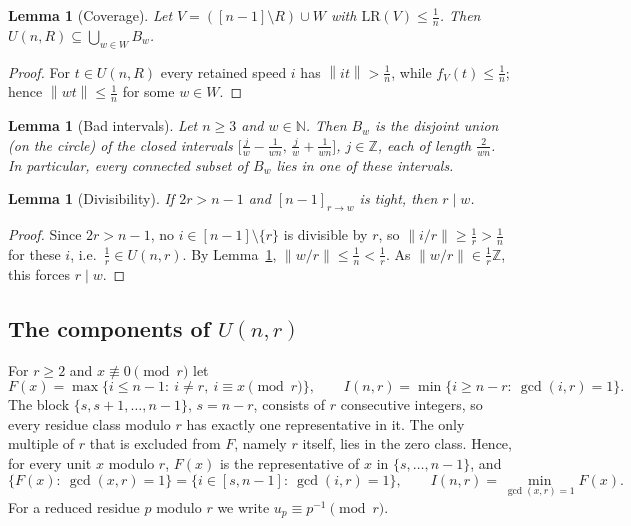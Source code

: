\documentclass[11pt]{article}
\newtheorem{lemma}[theorem]{Lemma}
\theoremstyle{definition}
\newcommand{\LR}{\mathrm{LR}}
\newcommand{\Z}{\mathbb{Z}}
\newcommand{\N}{\mathbb{N}}
\newcommand{\norm}[1]{\left\lVert #1 \right\rVert}
\begin{document}
\begin{lemma}[Coverage]\label{lem:cov}
Let $V=([n-1]\setminus R)\cup W$ with $\LR(V)\le\frac1n$. Then
$U(n,R)\subseteq\bigcup_{w\in W}B_w$.
\end{lemma}

\begin{proof}
For $t\in U(n,R)$ every retained speed $i$ has $\norm{it}>\frac1n$,
while $f_V(t)\le\frac1n$; hence $\norm{wt}\le\frac1n$ for some $w\in W$.
\end{proof}

\begin{lemma}[Bad intervals]\label{lem:int}
Let $n\ge3$ and $w\in\N$. Then $B_w$ is the disjoint union (on the
circle) of the closed intervals
$\bigl[\frac jw-\frac1{wn},\,\frac jw+\frac1{wn}\bigr]$, $j\in\Z$, each
of length $\frac{2}{wn}$. In particular, every connected subset of
$B_w$ lies in one of these intervals.
\end{lemma}

\begin{lemma}[Divisibility]\label{lem:div}
If $2r>n-1$ and $[n-1]_{r\to w}$ is tight, then $r\mid w$.
\end{lemma}

\begin{proof}
Since $2r>n-1$, no $i\in[n-1]\setminus\{r\}$ is divisible by $r$, so
$\norm{i/r}\ge\frac1r>\frac1n$ for these $i$, i.e.\
$\frac1r\in U(n,r)$. By Lemma~\ref{lem:cov},
$\norm{w/r}\le\frac1n<\frac1r$. As $\norm{w/r}\in\frac1r\Z$, this
forces $r\mid w$.
\end{proof}

\subsection{\texorpdfstring{The components of $U(n,r)$}{The components of U(n,r)}}

For $r\ge2$ and $x\not\equiv0\pmod r$ let
\[
F(x)=\max\{i\le n-1:\ i\ne r,\ i\equiv x\pmod r\},
\qquad
I(n,r)=\min\{i\ge n-r:\ \gcd(i,r)=1\}.
\]
The block $\{s,s+1,\dots,n-1\}$, $s=n-r$, consists of $r$ consecutive
integers, so every residue class modulo $r$ has exactly one
representative in it. The only multiple of $r$ that is excluded from
$F$, namely $r$ itself, lies in the zero class. Hence, for every unit
$x$ modulo $r$, $F(x)$ is the representative of $x$ in
$\{s,\dots,n-1\}$, and
\begin{equation}\label{eq:Fset}
\{F(x):\ \gcd(x,r)=1\}=\{i\in[s,n-1]:\ \gcd(i,r)=1\},\qquad
I(n,r)=\min_{\gcd(x,r)=1}F(x).
\end{equation}
For a reduced residue $p$ modulo $r$ we write $u_p\equiv p^{-1}\pmod r$.
\end{document}
